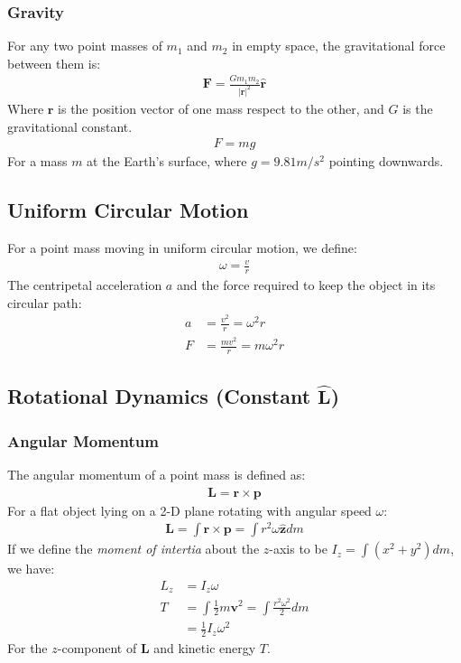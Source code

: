 \documentclass[11pt, letterpaper]{article}
\newcommand{\ve}[1]{
  \ensuremath{\bm{#1}}}	               %
\newcommand{\uve}[1]{
  \ensuremath{\bm{\hat{#1}}}}          %
\begin{document}
\begin{multicols*}{3}
\subsubsection{Gravity}
For any two point masses of $m_1$ and $m_2$ in empty space, the gravitational force between them is:
\begin{align*}
  \ve{F}=\frac{Gm_1m_2}{|\ve{r}|^2}\uve{r}
\end{align*}
Where $\ve{r}$ is the position vector of one mass respect to the other, and $G$ is the gravitational constant.
\begin{align*}
  F=mg
\end{align*}
\noindent For a mass $m$ at the Earth's surface, where $g=9.81m/s^2$ pointing downwards.
\subsection{Uniform Circular Motion}
For a point mass moving in uniform circular motion, we define:
\begin{align*}
  \omega=\frac{v}{r}
\end{align*}
The centripetal acceleration $a$ and the force required to keep the object in its circular path:
\begin{align*}
  a&=\frac{v^2}{r}=\omega^2r\\
  F&=\frac{mv^2}{r}=m\omega^2r
\end{align*}
\subsection{\texorpdfstring{Rotational Dynamics (Constant $\uve{L}$)}{Rotational Dynamics (Constant Direction of L)}} %
\subsubsection{Angular Momentum}
The angular momentum of a point mass is defined as:
\begin{align*}
  \ve{L}=\ve{r}\times\ve{p}
\end{align*}
For a flat object lying on a 2-D plane rotating with angular speed $\omega$:
\begin{align*}
  \ve{L}=\int\ve{r}\times\ve{p}=\int r^2\omega \uve{z}dm
\end{align*}
If we define the {\em moment of intertia} about the $z$-axis to be $I_z=\int (x^2+y^2)dm$, we have:
\begin{align*}
  L_z&=I_z\omega\\
  T&=\int\frac{1}{2}m\ve{v}^2=\int\frac{r^2\omega^2}{2}dm\\
  &=\frac{1}{2}I_z\omega^2
\end{align*}
For the $z$-component of $\ve{L}$ and kinetic energy $T$.

\end{multicols*}
\end{document}
